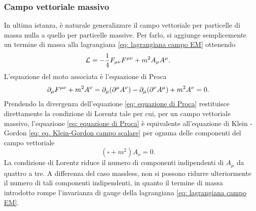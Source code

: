 \subsubsection{Campo vettoriale massivo}
In ultima istanza, è naturale generalizzare il campo vettoriale per particelle di massa nulla a quello per particelle massive. Per farlo, si aggiunge semplicemente un termine di massa alla lagrangiana \eqref{eq: lagrangiana campo EM} ottenendo
\begin{equation}
\label{eq: lagrangiana campo vettoriale massivo}
    \mathcal{L} = -\frac{1}{4}F_{\mu\nu}F^{\mu\nu} + m^2A_\mu A^\mu.
\end{equation}
L'equazione del moto associata è l'equazione di Proca 
\begin{equation}
\label{eq: equazione di Proca}
    \partial_{\mu}F^{\mu\nu} + m^2A^\nu = \partial_\mu(\partial^\mu A^\nu) - \partial_\mu(\partial^\nu A^\mu) + m^2A^\nu = 0.
\end{equation}
Prendendo la divergenza dell'equazione \eqref{eq: equazione di Proca} restituisce direttamente la condizione di Lorentz tale per cui, per un campo vettoriale massivo, l'equazione \eqref{eq: equazione di Proca} è equivalente all'equazione di Klein - Gordon \eqref{eq: eq. Klein-Gordon campo scalare} per ognuna delle componenti del campo vettoriale
\begin{equation}
    (\square + m^2)A_\nu = 0.
\end{equation}
La condizione di Lorentz riduce il numero di componenti indipendenti di $A_\mu$ da quattro a tre. A differenza del caso massless, non si possono ridurre ulteriormente il numero di tali componenti indipendenti, in quanto il termine di massa introdotto rompe l'invarianza di gauge della lagrangiana \eqref{eq: lagrangiana campo EM}.
